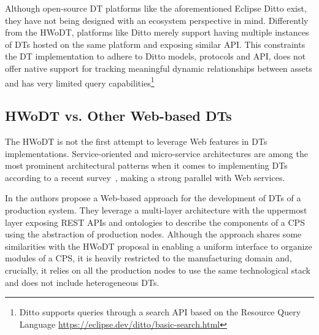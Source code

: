 Although open-source \ac{DT} platforms like the aforementioned Eclipse Ditto exist, they have not being designed with an ecosystem perspective in mind. 
Differently from the \ac{HWoDT}, platforms like Ditto merely support having multiple instances of \acp{DT} hosted on the same platform and exposing similar \ac{API}. 
%
This constraints the \ac{DT} implementation to adhere to Ditto models, protocols and \ac{API}, does not offer native support for tracking meaningful dynamic relationships between assets and has very limited query capabilities\footnote{Ditto supports queries through a search \ac{API} based on the Resource Query Language \url{https://eclipse.dev/ditto/basic-search.html}}


\subsection{HWoDT vs. Other Web-based DTs}


The \ac{HWoDT} is not the first attempt to leverage Web features in \acp{DT} implementations. Service-oriented and micro-service architectures are among the most prominent architectural patterns when it comes to implementing \acp{DT} according to a recent survey~\cite{ferko2022architecting}, making a strong parallel with Web services.

In \cite{Liu_Jiang_Jiang_2020} the authors propose a Web-based approach for the development of \acp{DT} of a production system.
They leverage a multi-layer architecture with the uppermost layer exposing \ac{REST} \acp{API} and ontologies to describe the components of a \ac{CPS} using the abstraction of production nodes.
%
Although the approach shares some similarities with the \ac{HWoDT} proposal in enabling a uniform interface to organize modules of a \ac{CPS}, it is heavily restricted to the manufacturing domain and, crucially, it relies on all the production nodes to use the same technological stack and does not include heterogeneous \acp{DT}.

